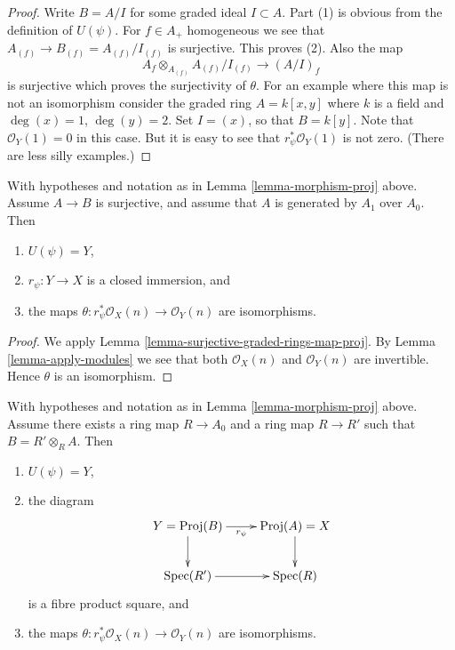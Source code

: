 \begin{proof}
Write $B = A/I$ for some graded ideal $I \subset A$.
Part (1) is obvious from the definition of $U(\psi)$.
For $f \in A_{+}$ homogeneous we see that
$A_{(f)} \to B_{(f)} = A_{(f)}/I_{(f)}$ is surjective.
This proves (2).
Also the map
$$
A_f \otimes_{A_{(f)}} A_{(f)}/I_{(f)} \to (A/I)_f
$$
is surjective which proves the surjectivity of $\theta$.
For an example where this map is not an isomorphism
consider the graded ring $A = k[x, y]$ where $k$ is a field
and $\deg(x) = 1$, $\deg(y) = 2$. Set $I = (x)$, so that
$B = k[y]$. Note that $\mathcal{O}_Y(1) = 0$ in this case.
But it is easy to see that $r_\psi^*\mathcal{O}_Y(1)$
is not zero. (There are less silly examples.)
\end{proof}

\begin{lemma}
\label{lemma-surjective-graded-rings-generated-degree-1-map-proj}
With hypotheses and notation as in Lemma \ref{lemma-morphism-proj} above.
Assume $A \to B$ is surjective, and assume that $A$ is generated
by $A_1$ over $A_0$. Then
\begin{enumerate}
\item $U(\psi) = Y$,
\item $r_\psi : Y \to X$ is a closed immersion, and
\item the maps $\theta : r_\psi^*\mathcal{O}_X(n) \to \mathcal{O}_Y(n)$
are isomorphisms.
\end{enumerate}
\end{lemma}

\begin{proof}
We apply Lemma \ref{lemma-surjective-graded-rings-map-proj}.
By Lemma \ref{lemma-apply-modules} we see that both
$\mathcal{O}_X(n)$ and $\mathcal{O}_Y(n)$
are invertible. Hence $\theta$ is an isomorphism.
\end{proof}

\begin{lemma}
\label{lemma-base-change-map-proj}
With hypotheses and notation as in Lemma \ref{lemma-morphism-proj} above.
Assume there exists a ring map $R \to A_0$ and a ring map
$R \to R'$ such that $B = R' \otimes_R A$. Then
\begin{enumerate}
\item $U(\psi) = Y$,
\item the diagram
$$
\xymatrix{
Y = \text{Proj}(B) \ar[r]_{r_\psi} \ar[d] &
\text{Proj}(A) = X \ar[d] \\
\Spec(R') \ar[r] &
\Spec(R)
}
$$
is a fibre product square, and
\item the maps $\theta : r_\psi^*\mathcal{O}_X(n) \to \mathcal{O}_Y(n)$
are isomorphisms.
\end{enumerate}
\end{lemma}

